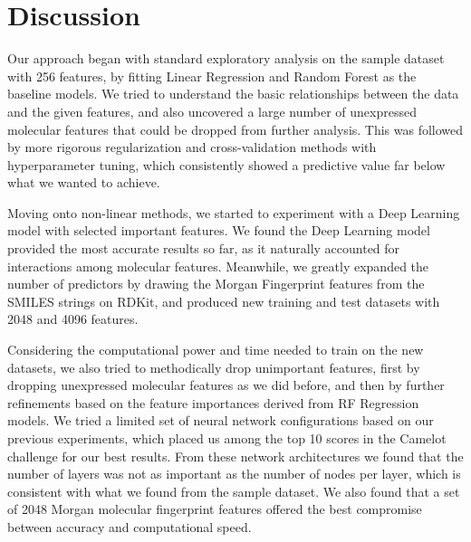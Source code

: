 \documentclass[11pt]{article}
\begin{document}





\section{Discussion}

Our approach began with standard exploratory analysis on the sample dataset with 256 features, by fitting Linear Regression and Random Forest as the baseline models. We tried to understand the basic relationships between the data and the given features, and also uncovered a large number of unexpressed molecular features that could be dropped from further analysis. This was followed by more rigorous regularization and cross-validation methods with hyperparameter tuning, which consistently showed a predictive value far below what we wanted to achieve.

Moving onto non-linear methods, we started to experiment with a Deep Learning model with selected important features. We found the Deep Learning model provided the most accurate results so far, as it naturally accounted for interactions among molecular features. Meanwhile, we greatly expanded the number of predictors by drawing the Morgan Fingerprint features from the SMILES strings on RDKit, and produced new training and test datasets with 2048 and 4096 features.

Considering the computational power and time needed to train on the new datasets, we also tried to methodically drop unimportant features, first by dropping unexpressed molecular features as we did before, and then by further refinements based on the feature importances derived from RF Regression models. We tried a limited set of neural network configurations based on our previous experiments, which placed us among the top 10 scores in the Camelot challenge for our best results. From these network architectures we found that the number of layers was not as important as the number of nodes per layer, which is consistent with what we found from the sample dataset. We also found that a set of 2048 Morgan molecular fingerprint features offered the best compromise between accuracy and computational speed.
\end{document}
